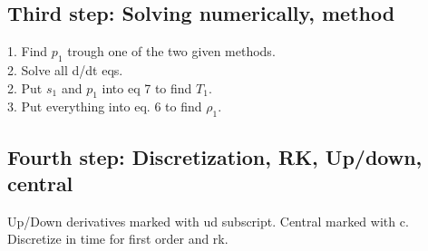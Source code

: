 \documentclass{article}
\begin{document}
\subsection{Third step: Solving numerically, method}
1. Find $p_1$ trough one of the two given methods.\\
2. Solve all d/dt eqs.\\
2. Put $s_1$ and $p_1$ into eq 7 to find $T_1$.\\
3. Put everything into eq. 6 to find $\rho_1$.

\subsection{Fourth step: Discretization, RK, Up/down, central}
Up/Down derivatives marked with ud subscript. Central marked with c. Discretize in time for first order and rk.





\end{document}
